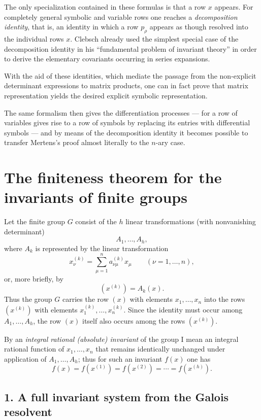 \documentclass[11pt]{article}
\begin{document}
The only specialization contained in these formulas is that a row $x$ appears. For completely general symbolic and variable rows one reaches a \emph{decomposition identity}, that is, an identity in which a row $p_\rho$ appears as though resolved into the individual rows $x$. Clebsch already used the simplest special case of the decomposition identity in his ``fundamental problem of invariant theory'' in order to derive the elementary covariants occurring in series expansions.

With the aid of these identities, which mediate the passage from the non-explicit determinant expressions to matrix products, one can in fact prove that matrix representation yields the desired explicit symbolic representation.

The same formalism then gives the differentiation processes --- for a row of variables gives rise to a row of symbols by replacing its entries with differential symbols --- and by means of the decomposition identity it becomes possible to transfer Mertens's proof almost literally to the $n$-ary case.

\clearpage

\section*{The finiteness theorem for the invariants of finite groups}

Let the finite group $G$ consist of the $h$ linear transformations (with nonvanishing determinant)
\[
A_1,\dots,A_h,
\]
where $A_k$ is represented by the linear transformation
\[
x^{(k)}_\nu=\sum_{\mu=1}^n a^{(k)}_{\nu\mu}x_\mu
\qquad (\nu=1,\dots,n),
\]
or, more briefly, by
\[
(x^{(k)})=A_k(x).
\]
Thus the group $G$ carries the row $(x)$ with elements $x_1,\dots,x_n$ into the rows $(x^{(k)})$ with elements $x^{(k)}_1,\dots,x^{(k)}_n$. Since the identity must occur among $A_1,\dots,A_h$, the row $(x)$ itself also occurs among the rows $(x^{(k)})$.

By an \emph{integral rational (absolute) invariant} of the group I mean an integral rational function of $x_1,\dots,x_n$ that remains identically unchanged under application of $A_1,\dots,A_h$; thus for such an invariant $f(x)$ one has
\[
f(x)=f(x^{(1)})=f(x^{(2)})=\cdots=f(x^{(h)}).
\tag{1}
\]

\subsection*{1. A full invariant system from the Galois resolvent}
\end{document}
